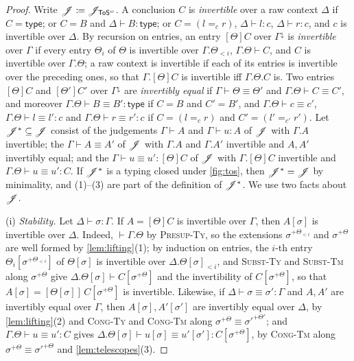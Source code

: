 \begin{proof}
    Write $\mathscr{J} \coloneqq \mathscr{J}_{\mathsf{ToS}^\omega}$. A conclusion $C$ is \emph{invertible} over a raw context $\Delta$ if $C = \mathsf{type}$; or $C = B$ and $\Delta \vdash B : \mathsf{type}$; or $C = (l =_c r)$, $\Delta \vdash l : c$, $\Delta \vdash r : c$, and $c$ is invertible over $\Delta$. By recursion on entries, an entry $[\Theta]C$ over $\Gamma^{\downarrow}$ is \emph{invertible} over $\Gamma$ if every entry $\Theta_i$ of $\Theta$ is invertible over $\Gamma.\Theta_{<i}$, $\Gamma.\Theta \vdash C$, and $C$ is invertible over $\Gamma.\Theta$; a raw context is invertible if each of its entries is invertible over the preceding ones, so that $\Gamma.[\Theta]C$ is invertible iff $\Gamma.\Theta.C$ is. Two entries $[\Theta]C$ and $[\Theta']C'$ over $\Gamma^{\downarrow}$ are \emph{invertibly equal} if $\Gamma \vdash \Theta \equiv \Theta'$ and $\Gamma.\Theta \vdash C \equiv C'$, and moreover $\Gamma.\Theta \vdash B \equiv B' : \mathsf{type}$ if $C = B$ and $C' = B'$, and $\Gamma.\Theta \vdash c \equiv c'$, $\Gamma.\Theta \vdash l \equiv l' : c$ and $\Gamma.\Theta \vdash r \equiv r' : c$ if $C = (l =_c r)$ and $C' = (l' =_{c'} r')$. Let $\mathscr{J}^* \subseteq \mathscr{J}$ consist of the judgements $\Gamma \vdash A$ and $\Gamma \vdash u : A$ of $\mathscr{J}$ with $\Gamma.A$ invertible; the $\Gamma \vdash A \equiv A'$ of $\mathscr{J}$ with $\Gamma.A$ and $\Gamma.A'$ invertible and $A, A'$ invertibly equal; and the $\Gamma \vdash u \equiv u' : [\Theta]C$ of $\mathscr{J}$ with $\Gamma.[\Theta]C$ invertible and $\Gamma.\Theta \vdash u \equiv u' : C$. If $\mathscr{J}^*$ is a typing closed under \cref{fig:tos}, then $\mathscr{J}^* = \mathscr{J}$ by minimality, and (1)--(3) are part of the definition of $\mathscr{J}^*$. We use two facts about $\mathscr{J}$.

    (i) \emph{Stability.} Let $\Delta \vdash \sigma : \Gamma$. If $A = [\Theta]C$ is invertible over $\Gamma$, then $A[\sigma]$ is invertible over $\Delta$. Indeed, $\vdash \Gamma.\Theta$ by \textsc{Presup-Ty}, so the extensions $\sigma^{+\Theta_{<i}}$ and $\sigma^{+\Theta}$ are well formed by \cref{lem:lifting}(1); by induction on entries, the $i$-th entry $\Theta_i[\sigma^{+\Theta_{<i}}]$ of $\Theta[\sigma]$ is invertible over $\Delta.\Theta[\sigma]_{<i}$, and \textsc{Subst-Ty} and \textsc{Subst-Tm} along $\sigma^{+\Theta}$ give $\Delta.\Theta[\sigma] \vdash C[\sigma^{+\Theta}]$ and the invertibility of $C[\sigma^{+\Theta}]$, so that $A[\sigma] = [\Theta[\sigma]]\,C[\sigma^{+\Theta}]$ is invertible. Likewise, if $\Delta \vdash \sigma \equiv \sigma' : \Gamma$ and $A, A'$ are invertibly equal over $\Gamma$, then $A[\sigma], A'[\sigma']$ are invertibly equal over $\Delta$, by \cref{lem:lifting}(2) and \textsc{Cong-Ty} and \textsc{Cong-Tm} along $\sigma^{+\Theta} \equiv \sigma'^{+\Theta'}$; and $\Gamma.\Theta \vdash u \equiv u' : C$ gives $\Delta.\Theta[\sigma] \vdash u[\sigma] \equiv u'[\sigma'] : C[\sigma^{+\Theta}]$, by \textsc{Cong-Tm} along $\sigma^{+\Theta} \equiv \sigma'^{+\Theta}$ and \cref{lem:telescopes}(3).


\end{proof}
